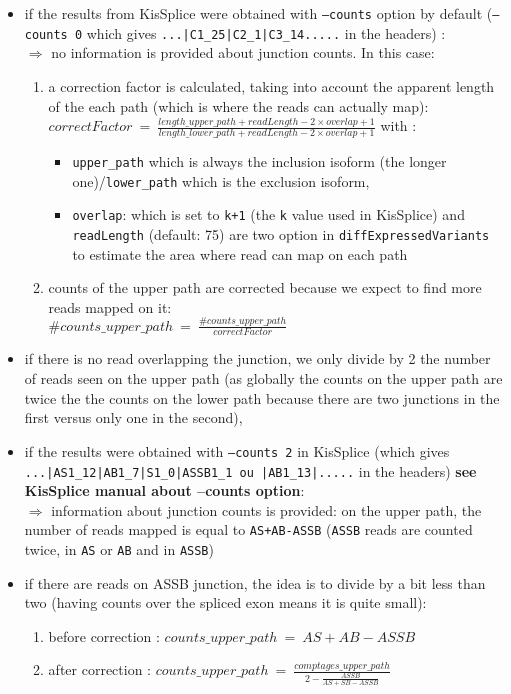 \documentclass[english, a4paper, 12pt]{article}
\begin{document}
\begin{itemize}
 \item if the results from KisSplice were obtained with \texttt{--counts} option by default (\texttt{--counts 0} which gives \texttt{...|C1\_25|C2\_1|C3\_14.....} in the headers) :\\
  $\Rightarrow$ no information is provided about junction counts. In this case:
 \begin{enumerate}
 \item a correction factor is calculated, taking into account the apparent length of the each path (which is where the reads can actually map):\\
   $correctFactor\:=\: \frac{length\_upper\_path + readLength - 2 \times overlap + 1}{length\_lower\_path + readLength - 2\times overlap + 1}$ with :
 \begin{itemize}
  \item \texttt{upper\_path} which is always the inclusion isoform (the longer one)/\texttt{lower\_path} which is the exclusion isoform,
  \item \texttt{overlap}: which is set to \texttt{k+1} (the \texttt{k} value used in KisSplice) and \texttt{readLength} (default: 75) are two option in \texttt{diffExpressedVariants} to estimate the area where read can map on each path
   \end{itemize}
            \item counts of the upper path are corrected because we expect to find more reads mapped on it:\\
            $\#counts\_upper\_path \:=\:  \frac{\#counts\_upper\_path}{correctFactor} $
 \end{enumerate}
 \item if there is no read overlapping the junction, we only divide by 2 the number of reads seen on the upper path (as globally the counts on the upper path are twice the the counts on the lower path because there are two junctions in the first versus only one in the second), 
 \item if the results were obtained with \texttt{--counts 2} in KisSplice (which gives \texttt{...|AS1\_12|AB1\_7|S1\_0|ASSB1\_1 ou |AB1\_13|.....} in the headers) \textbf{see KisSplice manual about --counts option}:\\
 $\Rightarrow$ information about junction counts is provided: on the upper path, the number of reads mapped is equal to \texttt{AS+AB-ASSB} (\texttt{ASSB} reads are counted twice, in \texttt{AS} or \texttt{AB} and in \texttt{ASSB})
  \item if there are reads on ASSB junction, the idea is to divide by a bit less than two (having counts over the spliced exon means it is quite small):
  \begin{enumerate}
    \item before correction : $counts\_upper\_path \:=\: AS+AB-ASSB $
    \item after correction : $counts\_upper\_path\:=\:\frac{comptages\_upper\_path}{2-\frac{ASSB}{AS+SB-ASSB}}$
  \end{enumerate}
 \end{itemize}
 
\end{document}

